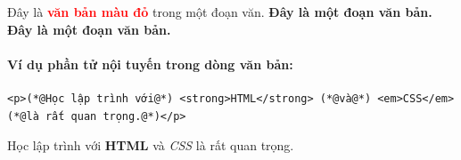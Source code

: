 \begin{browserWindow}
\sffamily\small
Đây là \textcolor{red}{\textbf{văn bản màu đỏ}} trong một đoạn văn. \textbf{Đây là một đoạn văn bản.} \textbf{Đây là một đoạn văn bản.}
\end{browserWindow}

\paragraph{Ví dụ phần tử nội tuyến trong dòng văn bản:}
\begin{codeWindow}
\begin{lstlisting}[language=HTML5]
<p>(*@Học lập trình với@*) <strong>HTML</strong> (*@và@*) <em>CSS</em> (*@là rất quan trọng.@*)</p>
\end{lstlisting}
\end{codeWindow}

\begin{browserWindow}
\sffamily\small
Học lập trình với \textbf{HTML} và \textit{CSS} là rất quan trọng.
\end{browserWindow}

